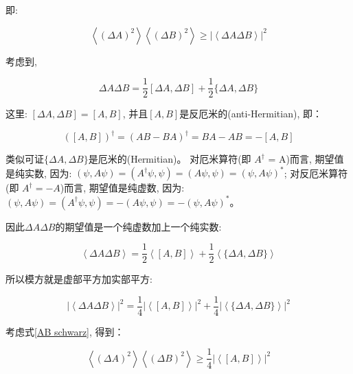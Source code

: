 即:

\begin{equation}\label{AB schwarz}
\left\langle {\left( {\Delta A} \right)^2 } \right\rangle
\left\langle {\left( {\Delta B} \right)^2 } \right\rangle  \ge
\left| {\left\langle {\Delta A\Delta B} \right\rangle } \right|^2
\end{equation}


考虑到,

\begin{equation*}
\Delta A\Delta B = \frac{1}{2}[\Delta A,\Delta B] + \frac{1}{2}\{
\Delta A,\Delta B\}
\end{equation*}

这里: $ [\Delta A,\Delta B] = [A,B] $,
并且$[A,B]$是反厄米的(anti-Hermitian), 即：


\begin{equation*}
\left( {[A,B]} \right)^\dag   = \left( {AB - BA} \right)^\dag   = BA
- AB =  - [A,B]
\end{equation*}

类似可证$\{ \Delta A, \Delta B\}$是厄米的(Hermitian)。 对厄米算符(即
$A^\dag$ = A)而言, 期望值是纯实数, 因为: $ \left( {\psi ,A\psi }
\right) = \left( {A^\dag  \psi ,\psi } \right) = \left( {A\psi ,\psi
} \right) = \left( {\psi ,A\psi } \right)^* $; 对反厄米算符(即
$A^\dag = -A$)而言, 期望值是纯虚数, 因为: $ \left( {\psi ,A\psi }
\right) = \left( {A^\dag  \psi ,\psi } \right) =  - \left( {A\psi
,\psi } \right) = - \left( {\psi ,A\psi } \right)^* $。

因此$ \Delta A\Delta B$的期望值是一个纯虚数加上一个纯实数:

\begin{equation*}
\left\langle {\Delta A\Delta B} \right\rangle  =
\frac{1}{2}\left\langle {[A,B]} \right\rangle  +
\frac{1}{2}\left\langle {\{ \Delta A,\Delta B\} } \right\rangle
\end{equation*}

所以模方就是虚部平方加实部平方:

\begin{equation*}
\left| {\left\langle {\Delta A\Delta B} \right\rangle } \right|^2  =
\frac{1}{4}\left| {\left\langle {[A,B]} \right\rangle } \right|^2  +
\frac{1}{4}\left| {\left\langle {\{ \Delta A,\Delta B\} }
\right\rangle } \right|^2
\end{equation*}


考虑式\ref{AB schwarz}, 得到：

\begin{equation*}
\left\langle {\left( {\Delta A} \right)^2 } \right\rangle
\left\langle {\left( {\Delta B} \right)^2 } \right\rangle  \ge
\frac{1}{4}\left| {\left\langle {[A,B]} \right\rangle } \right|^2
\end{equation*}


